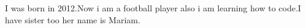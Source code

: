 I was born in 2012.Now i am a football player also i am learning how to code.I have sister too her name is Mariam.